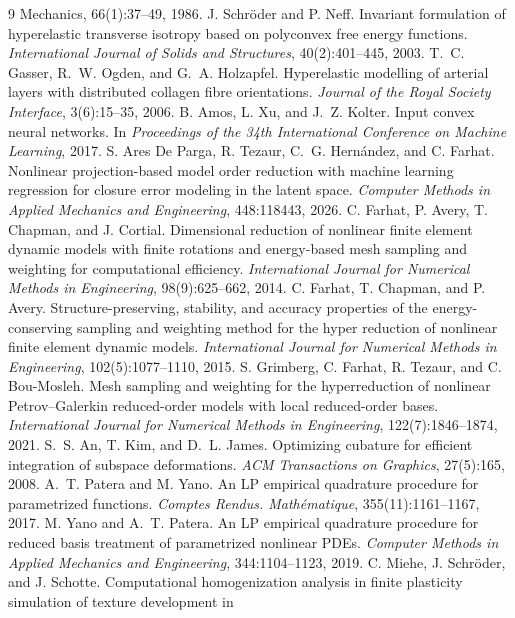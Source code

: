 \documentclass[10pt,a4paper]{article}
\begin{document}
\begin{thebibliography}{9}
{Mechanics}, 66(1):37--49, 1986.
J. Schr\"oder and P. Neff. Invariant formulation of hyperelastic
transverse isotropy based on polyconvex free energy functions.
\emph{International Journal of Solids and Structures}, 40(2):401--445,
2003.
T.~C. Gasser, R.~W. Ogden, and G.~A. Holzapfel. Hyperelastic modelling of
arterial layers with distributed collagen fibre orientations.
\emph{Journal of the Royal Society Interface}, 3(6):15--35, 2006.
B. Amos, L. Xu, and J.~Z. Kolter. Input convex neural networks. In
\emph{Proceedings of the 34th International Conference on Machine Learning},
2017.
S. Ares De Parga, R. Tezaur, C.~G. Hern\'andez, and C. Farhat.
Nonlinear projection-based model order reduction with machine learning
regression for closure error modeling in the latent space.
\emph{Computer Methods in Applied Mechanics and Engineering},
448:118443, 2026.
C. Farhat, P. Avery, T. Chapman, and J. Cortial. Dimensional reduction
of nonlinear finite element dynamic models with finite rotations and
energy-based mesh sampling and weighting for computational efficiency.
\emph{International Journal for Numerical Methods in Engineering},
98(9):625--662, 2014.
C. Farhat, T. Chapman, and P. Avery. Structure-preserving, stability,
and accuracy properties of the energy-conserving sampling and
weighting method for the hyper reduction of nonlinear finite element
dynamic models. \emph{International Journal for Numerical Methods in
Engineering}, 102(5):1077--1110, 2015.
S. Grimberg, C. Farhat, R. Tezaur, and C. Bou-Mosleh. Mesh sampling and
weighting for the hyperreduction of nonlinear Petrov--Galerkin
reduced-order models with local reduced-order bases. \emph{International
Journal for Numerical Methods in Engineering}, 122(7):1846--1874, 2021.
S.~S. An, T. Kim, and D.~L. James. Optimizing cubature for efficient
integration of subspace deformations. \emph{ACM Transactions on
Graphics}, 27(5):165, 2008.
A.~T. Patera and M. Yano. An LP empirical quadrature procedure for
parametrized functions. \emph{Comptes Rendus. Math\'ematique},
355(11):1161--1167, 2017.
M. Yano and A.~T. Patera. An LP empirical quadrature procedure for
reduced basis treatment of parametrized nonlinear PDEs. \emph{Computer
Methods in Applied Mechanics and Engineering}, 344:1104--1123, 2019.
C. Miehe, J. Schr\"oder, and J. Schotte. Computational homogenization
analysis in finite plasticity simulation of texture development in

\end{thebibliography}
\end{document}
